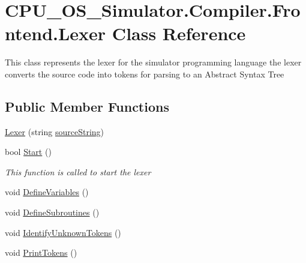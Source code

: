 \hypertarget{class_c_p_u___o_s___simulator_1_1_compiler_1_1_frontend_1_1_lexer}{}\section{C\+P\+U\+\_\+\+O\+S\+\_\+\+Simulator.\+Compiler.\+Frontend.\+Lexer Class Reference}
\label{class_c_p_u___o_s___simulator_1_1_compiler_1_1_frontend_1_1_lexer}


This class represents the lexer for the simulator programming language the lexer converts the source code into tokens for parsing to an Abstract Syntax Tree  


\subsection*{Public Member Functions}
\begin{DoxyCompactItemize}
\item 
\hyperlink{class_c_p_u___o_s___simulator_1_1_compiler_1_1_frontend_1_1_lexer_ad1b8ba022e0f486f963bf7f2104ef03d}{Lexer} (string \hyperlink{class_c_p_u___o_s___simulator_1_1_compiler_1_1_frontend_1_1_lexer_a735068e1008912edac69416bac78cef1}{source\+String})
\item 
bool \hyperlink{class_c_p_u___o_s___simulator_1_1_compiler_1_1_frontend_1_1_lexer_aa1d03860beb60dbb0c69ebbe70203def}{Start} ()
\begin{DoxyCompactList}\small\item\em This function is called to start the lexer \end{DoxyCompactList}\item 
void \hyperlink{class_c_p_u___o_s___simulator_1_1_compiler_1_1_frontend_1_1_lexer_a03760dde9cbc1aa09267e98d0788e544}{Define\+Variables} ()
\item 
void \hyperlink{class_c_p_u___o_s___simulator_1_1_compiler_1_1_frontend_1_1_lexer_ab611ae0862d84b5446643fd75577324e}{Define\+Subroutines} ()
\item 
void \hyperlink{class_c_p_u___o_s___simulator_1_1_compiler_1_1_frontend_1_1_lexer_a9fa262282fe000e66c4f97b899c39cdc}{Identify\+Unknown\+Tokens} ()
\item 
void \hyperlink{class_c_p_u___o_s___simulator_1_1_compiler_1_1_frontend_1_1_lexer_a6c12b898a982f63169687cca009d18e5}{Print\+Tokens} ()
\end{DoxyCompactItemize}
